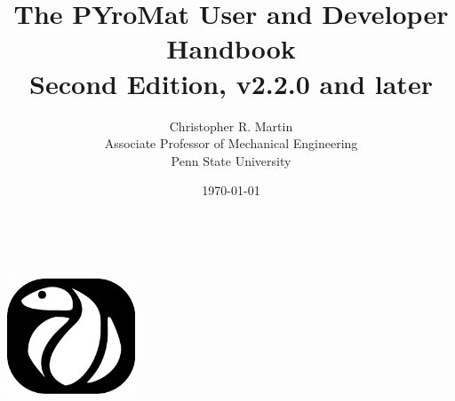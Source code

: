 \documentclass[11pt]{report}
\title{The PYroMat User and Developer Handbook\\
{\large Second Edition, v2.2.0 and later}}
\author{Christopher R. Martin\\
Associate Professor of Mechanical Engineering\\
Penn State University}
\date{\today}
\begin{document}
\pagestyle{empty}
\ \\
\vspace{2in}

\begin{center}
\includegraphics[width=1.5in]{figures/PYro_Black_Small}
\end{center}
\pagebreak

\maketitle

\pagebreak
\pagestyle{plain}

\tableofcontents













\end{document}
